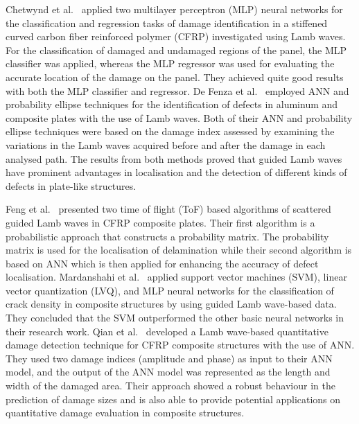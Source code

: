 Chetwynd et al.~\cite{chetwynd2008damage} applied two multilayer perceptron (MLP) neural networks for the classification and regression tasks of
damage identification in a stiffened curved carbon fiber reinforced polymer (CFRP) investigated using Lamb waves.
For the classification of damaged and undamaged regions of the panel, the MLP classifier was applied, whereas the MLP regressor was used for evaluating the accurate location of the damage on the panel. 
They achieved quite good results with both the MLP classifier and regressor.
De Fenza et al.~\cite{de2015application} employed ANN and probability ellipse techniques for the identification of defects in aluminum and composite plates with the use of Lamb waves.
Both of their ANN and probability ellipse techniques were based on the damage index assessed by examining the variations in the Lamb waves acquired before and after the damage in each analysed path.
The results from both methods proved that guided Lamb waves have prominent advantages in localisation and the detection of different kinds of defects in plate-like structures. 

Feng et al.~\cite{feng2019locating} presented two time of flight (ToF) based algorithms of scattered guided Lamb waves in CFRP composite plates.
Their first algorithm is a probabilistic approach that constructs a probability
matrix. 
The probability matrix is used for the localisation of delamination while
their second algorithm is based on ANN which is then applied for enhancing
the accuracy of defect localisation.
Mardanshahi et al.~\cite{mardanshahi2020detection} applied support vector machines (SVM), linear vector quantization (LVQ), and MLP neural networks for the classification of crack density in composite structures by using guided Lamb wave-based data.
They concluded that the SVM outperformed the other basic neural networks in
their research work.
Qian et al.~\cite{qian2020application} developed a Lamb wave-based quantitative damage detection technique for CFRP composite structures with the use of ANN.  
They used two damage indices (amplitude and phase) as input to their ANN model, and the output of the ANN model was represented as the length and width of the damaged area.  
Their approach showed a robust behaviour in the prediction of damage sizes and is also able to provide potential applications on quantitative damage evaluation in composite structures.  

